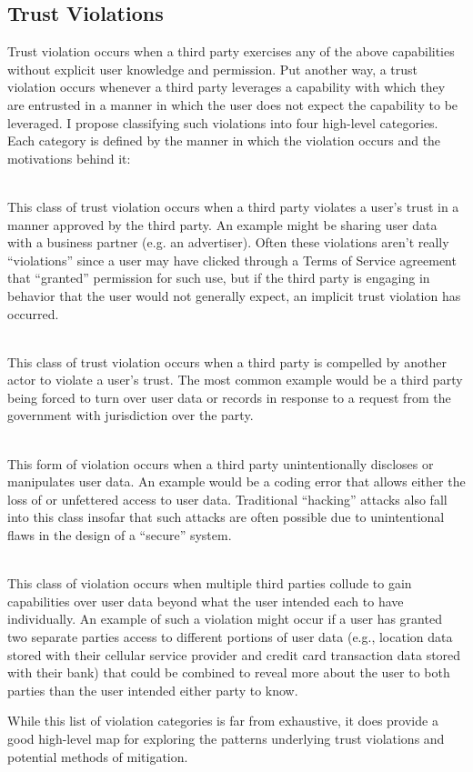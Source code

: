 \subsection{Trust Violations}

Trust violation occurs when a third party exercises any of the above
capabilities without explicit user knowledge and permission. Put
another way, a trust violation occurs whenever a third party leverages
a capability with which they are entrusted in a manner in which the
user does not expect the capability to be leveraged. I propose
classifying such violations into four high-level categories. Each
category is defined by the manner in which the violation occurs and
the motivations behind it:

\begin{packed_desc}
\item[Implicit (P-Violation):] \hfill \\ This class of trust violation
  occurs when a third party violates a user's trust in a manner
  approved by the third party. An example might be sharing user data
  with a business partner (e.g. an advertiser). Often these violations
  aren't really ``violations'' since a user may have clicked through a
  Terms of Service agreement that ``granted'' permission for such use,
  but if the third party is engaging in behavior that the user would
  not generally expect, an implicit trust violation has occurred.
\item[Compelled (C-Violation):] \hfill \\ This class of trust
  violation occurs when a third party is compelled by another actor to
  violate a user's trust. The most common example would be a third
  party being forced to turn over user data or records in response to
  a request from the government with jurisdiction over the party.
\item[Unintentional (U-Violation):] \hfill \\ This form of violation
  occurs when a third party unintentionally discloses or manipulates
  user data. An example would be a coding error that allows either the
  loss of or unfettered access to user data. Traditional ``hacking''
  attacks also fall into this class insofar that such attacks are
  often possible due to unintentional flaws in the design of a
  ``secure'' system.
\item[Colluding (L-Violation):] \hfill \\ This class of violation
  occurs when multiple third parties collude to gain capabilities over
  user data beyond what the user intended each to have
  individually. An example of such a violation might occur if a user
  has granted two separate parties access to different portions of
  user data (e.g., location data stored with their cellular service
  provider and credit card transaction data stored with their bank)
  that could be combined to reveal more about the user to both parties
  than the user intended either party to know.
\end{packed_desc}

While this list of violation categories is far from exhaustive, it
does provide a good high-level map for exploring the patterns
underlying trust violations and potential methods of mitigation.
